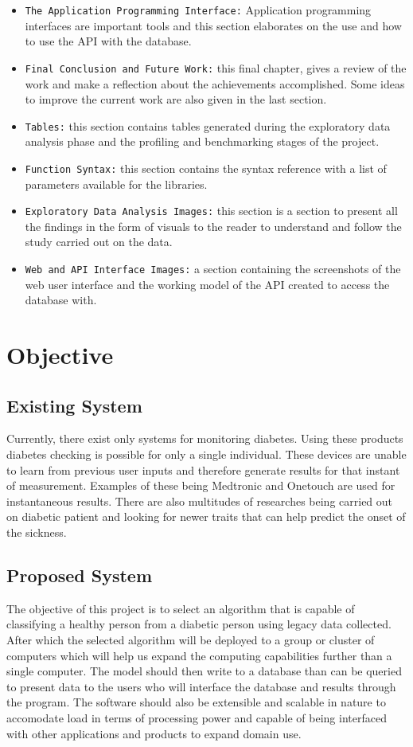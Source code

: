 \documentclass[12pt]{article}
\begin{document}
\begin{itemize}
\item \texttt{The Application Programming Interface:} Application programming interfaces are important tools and this section elaborates on the use and how to use the API with the database.
\item \texttt{Final Conclusion and Future Work:} this final chapter, gives a review of the work and make a reflection about the achievements accomplished. Some ideas to improve the current work are also given in the last section.
\item \texttt{Tables:} this section contains tables generated during the exploratory data analysis phase and the profiling and benchmarking stages of the project.
\item \texttt{Function Syntax:} this section contains the syntax reference with a list of parameters available for the libraries.
\item \texttt{Exploratory Data Analysis Images:} this section is a section to present all the findings in the form of visuals to the reader to understand and follow the study carried out on the data.
\item \texttt{Web and API Interface Images:} a section containing the screenshots of the web user interface and the working model of the API created to access the database with.
\end{itemize}


\clearpage
\newpage
\section{Objective}
\subsection{Existing System}
Currently, there exist only systems for monitoring diabetes. Using these products diabetes checking is possible for only a single individual. These devices are unable to learn from previous user inputs and therefore generate results for that instant of measurement. Examples of these being Medtronic\cite{medtronic} and Onetouch\cite{onetouch} are used for instantaneous results. There are also multitudes of researches being carried out on diabetic patient and looking for newer traits that can help predict the onset of the sickness.

\subsection{Proposed System}
The objective of this project is to select an algorithm that is capable of classifying a healthy person from a diabetic person using legacy data collected. After which the selected algorithm will be deployed to a group or cluster of computers which will help us expand the computing capabilities further than a single computer. The model should then write to a database than can be queried to present data to the users who will interface the database and results through the program. The software should also be extensible and scalable in nature to accomodate load in terms of processing power and capable of being interfaced with other applications and products to expand domain use.
\end{document}

